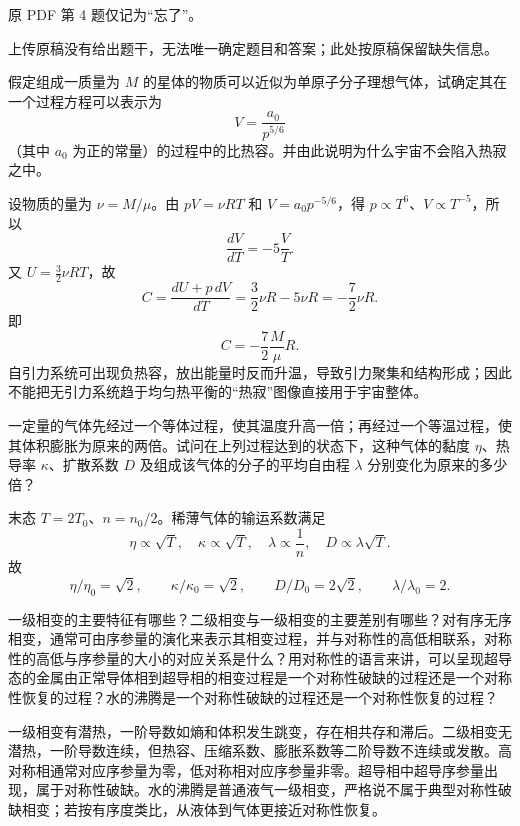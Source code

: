 \begin{question}
原 PDF 第 4 题仅记为“忘了”。
\begin{solution}
上传原稿没有给出题干，无法唯一确定题目和答案；此处按原稿保留缺失信息。
\end{solution}
\end{question}

\begin{question}
假定组成一质量为 $M$ 的星体的物质可以近似为单原子分子理想气体，试确定其在一个过程方程可以表示为
\[
V=\frac{a_0}{p^{5/6}}
\]
（其中 $a_0$ 为正的常量）的过程中的比热容。并由此说明为什么宇宙不会陷入热寂之中。
\begin{solution}
设物质的量为 $\nu=M/\mu$。由 $pV=\nu RT$ 和 $V=a_0p^{-5/6}$，得 $p\propto T^6$、$V\propto T^{-5}$，所以
\[
\frac{dV}{dT}=-5\frac{V}{T}.
\]
又 $U=\frac32\nu RT$，故
\[
C=\frac{dU+p\,dV}{dT}
=\frac32\nu R-5\nu R=-\frac72\nu R.
\]
即
\[
C=-\frac72\frac{M}{\mu}R.
\]
自引力系统可出现负热容，放出能量时反而升温，导致引力聚集和结构形成；因此不能把无引力系统趋于均匀热平衡的“热寂”图像直接用于宇宙整体。

\end{solution}
\end{question}

\begin{question}
一定量的气体先经过一个等体过程，使其温度升高一倍；再经过一个等温过程，使其体积膨胀为原来的两倍。试问在上列过程达到的状态下，这种气体的黏度 $\eta$、热导率 $\kappa$、扩散系数 $D$ 及组成该气体的分子的平均自由程 $\lambda$ 分别变化为原来的多少倍？
\begin{solution}
末态 $T=2T_0$、$n=n_0/2$。稀薄气体的输运系数满足
\[
\eta\propto \sqrt T,
\quad
\kappa\propto \sqrt T,
\quad
\lambda\propto \frac1n,
\quad
D\propto \lambda\sqrt T.
\]
故
\[
\eta/\eta_0=\sqrt2,
\qquad \kappa/\kappa_0=\sqrt2,
\qquad D/D_0=2\sqrt2,
\qquad \lambda/\lambda_0=2.
\]
\end{solution}
\end{question}

\begin{question}
一级相变的主要特征有哪些？二级相变与一级相变的主要差别有哪些？对有序无序相变，通常可由序参量的演化来表示其相变过程，并与对称性的高低相联系，对称性的高低与序参量的大小的对应关系是什么？用对称性的语言来讲，可以呈现超导态的金属由正常导体相到超导相的相变过程是一个对称性破缺的过程还是一个对称性恢复的过程？水的沸腾是一个对称性破缺的过程还是一个对称性恢复的过程？
\begin{solution}
一级相变有潜热，一阶导数如熵和体积发生跳变，存在相共存和滞后。二级相变无潜热，一阶导数连续，但热容、压缩系数、膨胀系数等二阶导数不连续或发散。高对称相通常对应序参量为零，低对称相对应序参量非零。超导相中超导序参量出现，属于对称性破缺。水的沸腾是普通液气一级相变，严格说不属于典型对称性破缺相变；若按有序度类比，从液体到气体更接近对称性恢复。

\end{solution}
\end{question}

